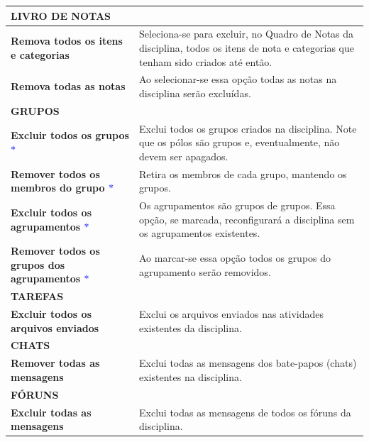 \begin{longtable}[htbp!]{p{6cm}|p{9cm}}
\rowcolor[rgb]{0.8,0.8,0.8} \textbf{LIVRO DE NOTAS}&\\\hline
\textbf{Remova todos os itens e categorias} & Seleciona-se para excluir, no Quadro de Notas da disciplina, todos os itens de nota e categorias que tenham sido criados até então.\\\hline
\textbf{Remova todas as notas} & Ao selecionar-se essa opção todas as notas na disciplina serão excluídas.\\\hline
\rowcolor[rgb]{0.8,0.8,0.8} \textbf{GRUPOS}&\\\hline
\textbf{Excluir todos os grupos \textcolor{blue}{$\ast$}} & Exclui todos os grupos criados na disciplina. Note que os pólos são grupos e, eventualmente, não devem ser apagados.\\\hline
\textbf{Remover todos os membros do grupo \textcolor{blue}{$\ast$}} & Retira os membros de cada grupo, mantendo os grupos.\\\hline
\textbf{Excluir todos os agrupamentos \textcolor{blue}{$\ast$}} & Os agrupamentos são grupos de grupos. Essa opção, se marcada, reconfigurará a disciplina sem os agrupamentos existentes.\\\hline
\textbf{Remover todos os grupos dos agrupamentos \textcolor{blue}{$\ast$}} & Ao marcar-se essa opção todos os grupos do agrupamento serão removidos.\\\hline
\rowcolor[rgb]{0.8,0.8,0.8} \textbf{TAREFAS}&\\\hline
\textbf{Excluir todos os arquivos enviados} & Exclui os arquivos enviados nas atividades existentes da disciplina.\\\hline
\rowcolor[rgb]{0.8,0.8,0.8} \textbf{CHATS}&\\\hline
\textbf{Remover todas as mensagens} & Exclui todas as mensagens dos bate-papos (chats) existentes na disciplina.\\\hline
\rowcolor[rgb]{0.8,0.8,0.8} \textbf{FÓRUNS}&\\\hline
\textbf{Excluir todas as mensagens} & Exclui todas as mensagens de todos os fóruns da disciplina.\\\hline

\end{longtable}
